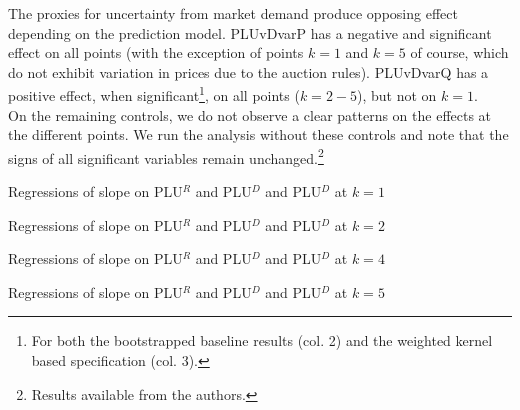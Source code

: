 The proxies for uncertainty from market demand produce opposing effect depending on the prediction model. PLUvDvarP has a negative and significant effect on all points (with the exception of points $k=1$ and $k=5$ of course, which do not exhibit variation in prices due to the auction rules). PLUvDvarQ has a positive effect, when significant\footnote{For both the bootstrapped baseline results (col. 2) and the weighted kernel based specification (col. 3). }, on all points ($k=2-5$), but not on $k=1$. \\

On the remaining controls, we do not observe a clear patterns on the effects at the different points. We run the analysis without these controls and note that the signs of all significant variables remain unchanged.\footnote{Results available from the authors.}\\


\begin{table}[!ht]
\vspace{-2.5cm}

\vspace{-0.2cm}
\caption{\label{mainNS1_1} Regressions of slope on PLU$^R$ and PLU$^{D}$ and PLU$^{D}$ at $k=1$}
\vspace{0.9cm}

\vspace{-0.2cm}
\caption{\label{mainNS1_3} Regressions of slope on PLU$^R$ and PLU$^{D}$ and PLU$^{D}$ at $k=2$}
\end{table}
\pagestyle{empty}

\begin{table}[!ht]
\vspace{-2.5cm}

\vspace{-0.2cm}
\caption{\label{mainNS1_7} Regressions of slope on PLU$^R$ and PLU$^{D}$ and PLU$^{D}$ at $k=4$}
\vspace{0.9cm}

\vspace{-0.2cm}
\caption{\label{mainNS1_9} Regressions of slope on PLU$^R$ and PLU$^{D}$ and PLU$^{D}$ at $k=5$}
\end{table}


